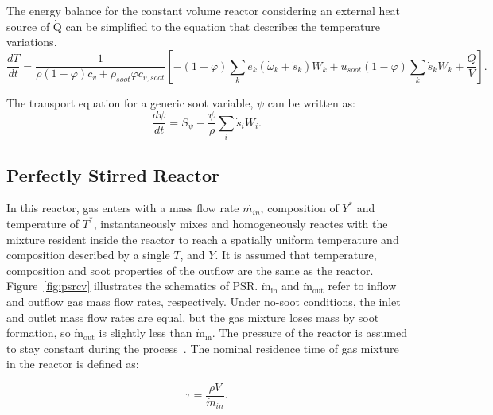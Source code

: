 The energy balance for the constant volume reactor considering an external heat source of $\mathrm{\dot{Q}}$ can be simplified to the equation that describes the temperature variations.
\begin{equation}
	\frac{d T}{d t}=
	\frac{1}{\rho (1-\varphi) c_v+\rho_{soot}\varphi c_{v,soot}}
	\left[
		-(1-\varphi)\sum_k e_k
			\left(
				\dot{\omega}_k+\dot{s}_k
			\right) W_k
		+u_{soot}(1-\varphi)\sum_k \dot{s}_k W_k
		+\frac{\dot{Q}}{V}
	\right]
	\label{eqn:energyconstuv}.
\end{equation}



The transport equation for a generic soot variable, $\psi$ can be written as:
\begin{equation}
	\frac{d \psi}{d t}= S_{\psi} - \frac{\psi}{\rho} \sum_i \dot{s}_i W_i
	\label{eqn:sootconstuv}.
\end{equation}

\subsection{Perfectly Stirred Reactor}
In this reactor, gas enters with a mass flow rate $\dot{m_{in}}$, composition of $Y^\ast$ and temperature of $T^\ast$, instantaneously mixes and homogeneously reactes with the mixture resident inside the reactor to reach a spatially uniform temperature and composition described by a single $T$, and $Y$. It is assumed that temperature, composition and soot properties of the outflow are the same as the reactor. Figure~\ref{fig:psrcv} illustrates the schematics of PSR. $\mathrm{\dot{m}_{in}}$ and $\mathrm{\dot{m}_{out}}$ refer to inflow and outflow gas mass flow rates, respectively. Under no-soot conditions, the inlet and outlet mass flow rates are equal, but the gas mixture loses mass by soot formation, so $\mathrm{\dot{m}_{out}}$ is slightly less than $\mathrm{\dot{m}_{in}}$. The pressure of the reactor is assumed to stay constant during the process~\citep{kee2017chemically}. The nominal residence time of gas mixture in the reactor is defined as:

\begin{equation}
	\tau = \frac{\rho V}{\dot{m}_{in}}
	\label{eqn:taupsr}.
\end{equation} 

 

